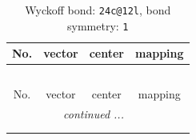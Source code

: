 \documentclass[fleqn,8pt]{jsarticle}
\begin{document}
\renewcommand{\arraystretch}{1.2}
\begin{longtable}{cccc}
\caption{Wyckoff bond: {\tt 24c@12l}, bond symmetry: {\tt 1}}
 \\
 \hline \hline
No. & vector & center & mapping \\ \hline \endfirsthead

\multicolumn{3}{l}{\tablename\ \thetable{}} \\
 \hline \hline
No. & vector & center & mapping \\ \hline \endhead

 \hline \hline
\multicolumn{3}{r}{\footnotesize\it continued ...} \\ \endfoot

 \hline \hline
\multicolumn{3}{r}{} \\ \endlastfoot


\end{longtable}
\end{document}
